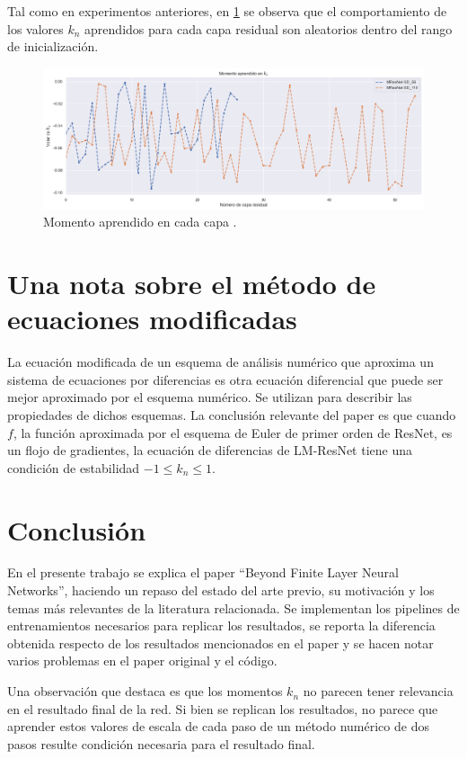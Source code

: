 \documentclass[titlepage,a4paper,oneside]{article}
\begin{document}
Tal como en experimentos anteriores, en \ref{sd_momentum} se observa que el comportamiento de los valores $k_n$ aprendidos para cada capa residual son aleatorios dentro del rango de inicialización.

\begin{figure}[H]
\centering
\includegraphics[width=\textwidth]{images/momentum_sd.png}
\caption{Momento aprendido en cada capa .}
\label{sd_momentum}
\end{figure}

\section{Una nota sobre el método de ecuaciones modificadas}
La ecuación modificada de un esquema de análisis numérico que aproxima un sistema de ecuaciones por diferencias es otra ecuación diferencial que puede ser mejor aproximado por el esquema numérico. Se utilizan para describir las propiedades de dichos esquemas. La conclusión relevante del paper es que cuando $f$, la función aproximada por el esquema de Euler de primer orden de ResNet, es un flojo de gradientes, la ecuación de diferencias de LM-ResNet tiene una condición de estabilidad $-1 \leq k_n \leq 1$.

\section{Conclusión}
En el presente trabajo se explica el paper ``Beyond Finite Layer Neural Networks'', haciendo un repaso del estado del arte previo, su motivación y los temas más relevantes de la literatura relacionada. Se implementan los pipelines de entrenamientos necesarios para replicar los resultados, se reporta la diferencia obtenida respecto de los resultados mencionados en el paper y se hacen notar varios problemas en el paper original y el código.

Una observación que destaca es que los momentos $k_n$ no parecen tener relevancia en el resultado final de la red. Si bien se replican los resultados, no parece que aprender estos valores de escala de cada paso de un método numérico de dos pasos resulte condición necesaria para el resultado final.
\end{document}
